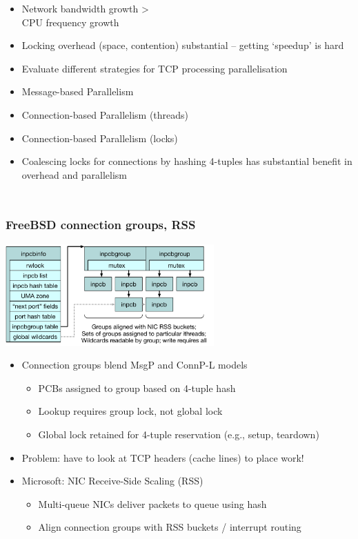 \begin{frame}
\begin{columns}[T]
      \begin{itemize}
	\item Network bandwidth growth > \\ CPU frequency growth
	\item Locking overhead (space, contention) substantial -- getting
	  `speedup' is hard
	\item Evaluate different strategies for TCP processing parallelisation
	\item Message-based Parallelism
	\item Connection-based Parallelism (threads)
	\item Connection-based Parallelism (locks)
	\item Coalescing locks for connections by hashing 4-tuples has
	  substantial benefit in overhead and parallelism
      \end{itemize}
  \end{columns}
\end{frame}

\begin{frame}
  \frametitle{FreeBSD connection groups, RSS}

  \begin{center}
    \includegraphics[width=0.6\textwidth]{../../figures/tcp-hash-table-groups.pdf}
  \end{center}

  \begin{itemize}
    \item Connection groups blend MsgP and ConnP-L models
      \begin{itemize}
	\item PCBs assigned to group based on 4-tuple hash
	\item Lookup requires group lock, not global lock
	\item Global lock retained for 4-tuple reservation (e.g., setup,
	  teardown)
      \end{itemize}
    \item Problem: have to look at TCP headers (cache lines) to place work!

    \pause

    \item Microsoft: NIC Receive-Side Scaling (RSS)
      \begin{itemize}
	\item Multi-queue NICs deliver packets to queue using hash
	\item Align connection groups with RSS buckets / interrupt routing
      \end{itemize}
  \end{itemize}
\end{frame}


